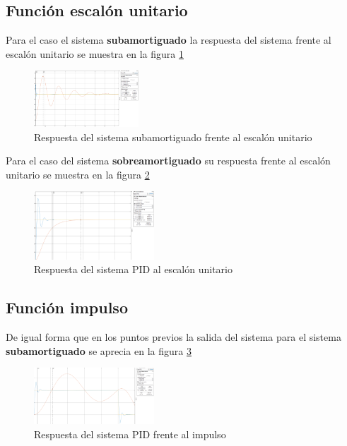 \documentclass[conference]{IEEEtran}
\begin{document}
	
	\subsection{\textbf{Función escalón unitario}}
	Para el caso el sistema \textbf{subamortiguado} la respuesta del sistema frente al escalón unitario se muestra en la figura \ref{fig:res-subamortguado-escalon}
	
	\begin{figure}[h]
		\centering
		\includegraphics[width=0.35\textwidth]{media1/res-subamortguado-escalon}
		\caption{Respuesta del sistema subamortiguado frente al escalón unitario}
		\label{fig:res-subamortguado-escalon}
	\end{figure}
	
	Para el caso del sistema \textbf{sobreamortiguado} su respuesta frente al escalón unitario se muestra en la figura \ref{fig:res-sobreamortguado-escalon}
	
	
	\begin{figure}[h]
		\centering
		\includegraphics[width=0.4\textwidth]{media1/res-sobreamortiguado-escalon}
		\caption{Respuesta del sistema PID al escalón unitario}
		\label{fig:res-sobreamortguado-escalon}
	\end{figure}	
	
	
	\subsection{\textbf{Función impulso}}
	
	De igual forma que en los puntos previos la salida del sistema para el sistema \textbf{subamortiguado} se aprecia en la figura \ref{fig:res-subamortguado-impulso}
	
	
	\begin{figure}[h]
		\centering
		\includegraphics[width=0.4\textwidth]{media1/res-subamortguado-impulso}
		\caption{Respuesta del sistema PID frente al impulso}
		\label{fig:res-subamortguado-impulso}
	\end{figure}
	
\end{document}
